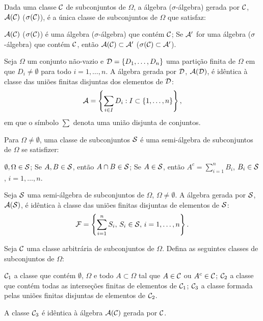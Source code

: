 \begin{theorem}
	Dada uma classe $\mathcal{C}$ de subconjuntos de $\Omega$, a álgebra ($\sigma$-álgebra) gerada por $\mathcal{C}$, $\mathcal{A}(\mathcal{C})$ ($\sigma(\mathcal{C})$), é a única classe de subconjuntos de $\Omega$ que satisfaz:
	\begin{outline}[enumerate]
		\1 $\mathcal{A}(\mathcal{C})$ ($\sigma(\mathcal{C})$) é uma álgebra ($\sigma$-álgebra) que contém $\mathcal{C}$;
		\1 Se $\mathcal{A}'$ for uma álgebra ($\sigma$-álgebra) que contém $\mathcal{C}$, então $\mathcal{A}(\mathcal{C}) \subset \mathcal{A}'$ ($\sigma(\mathcal{C}) \subset \mathcal{A}'$).
	\end{outline}
\end{theorem}

\begin{theorem}
	Seja $\Omega$ um conjunto não-vazio e $\mathcal{D} = \{D_1, \ldots, D_n\}$ uma partição finita de $\Omega$ em que $D_i \neq \emptyset$ para todo $i = 1, \ldots, n$. A álgebra gerada por $\mathcal{D}$, $\mathcal{A}(\mathcal{D})$, é idêntica à classe das uniões finitas disjuntas dos elementos de $\mathcal{D}$:
	\[
	\mathcal{A} = \left\{ \sum_{i \in I} D_i : I \subset \{1, \ldots, n\} \right\},
	\]
	em que o símbolo $\sum$ denota uma união disjunta de conjuntos.
\end{theorem}

\begin{definition}
	Para $\Omega \neq \emptyset$, uma classe de subconjuntos $\mathcal{S}$ é uma semi-álgebra de subconjuntos de $\Omega$ se satisfizer:
	\begin{outline}[enumerate]
		\1 $\emptyset, \Omega \in \mathcal{S}$;
		\1 Se $A, B \in \mathcal{S}$, então $A \cap B \in \mathcal{S}$;
		\1 Se $A \in \mathcal{S}$, então $A^c = \sum_{i=1}^{n} B_i$, $B_i \in \mathcal{S}$, $i = 1, \ldots, n$.
	\end{outline}
\end{definition}

\begin{theorem}
	Seja $\mathcal{S}$ uma semi-álgebra de subconjuntos de $\Omega$, $\Omega \neq \emptyset$. A álgebra gerada por $\mathcal{S}$, $\mathcal{A}(\mathcal{S})$, é idêntica à classe das uniões finitas disjuntas de elementos de $\mathcal{S}$:
	\[
	\mathcal{F} = \left\{ \sum_{i=1}^{n} S_i, \, S_i \in \mathcal{S}, \, i = 1, \ldots, n \right\}.
	\]
\end{theorem}

\begin{theorem}
	Seja $\mathcal{C}$ uma classe arbitrária de subconjuntos de $\Omega$. Defina as seguintes classes de subconjuntos de $\Omega$:
	\begin{outline}[enumerate]
		\1 $\mathcal{C}_1$ a classe que contém $\emptyset$, $\Omega$ e todo $A \subset \Omega$ tal que $A \in \mathcal{C}$ ou $A^c \in \mathcal{C}$;
		\1 $\mathcal{C}_2$ a classe que contém todas as interseções finitas de elementos de $\mathcal{C}_1$;
		\1 $\mathcal{C}_3$ a classe formada pelas uniões finitas disjuntas de elementos de $\mathcal{C}_2$.
	\end{outline}
	A classe $\mathcal{C}_3$ é idêntica à álgebra $\mathcal{A}(\mathcal{C})$ gerada por $\mathcal{C}$.
\end{theorem}

